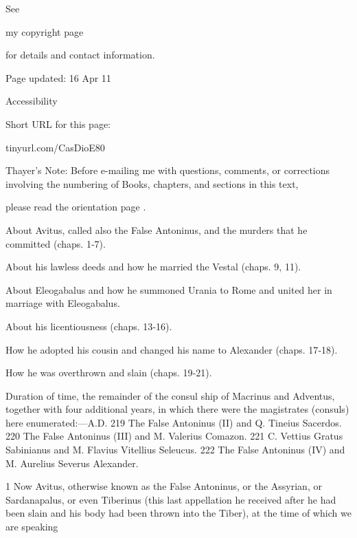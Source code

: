 See

my copyright page

for details and contact information.

Page updated:
16 Apr 11

Accessibility


Short URL for this page:

tinyurl.com/CasDioE80

Thayer's Note: Before e-mailing me with questions, comments, or corrections involving the numbering of Books, chapters, and sections in this text,

please read the orientation page .

About Avitus, called also the False Antoninus, and the murders that he committed (chaps. 1\texthebrew{‑}7).

About his lawless deeds and how he married the Vestal (chaps. 9, 11).

About Eleogabalus and how he summoned Urania to Rome and united her in marriage with Eleogabalus.

About his licentiousness (chaps. 13\texthebrew{‑}16).

How he adopted his cousin and changed his name to Alexander (chaps. 17\texthebrew{‑}18).

How he was overthrown and slain (chaps. 19\texthebrew{‑}21).

Duration of time, the remainder of the consul ­ship of Macrinus and Adventus, together with four additional years, in which there were the magistrates (consuls) here enumerated:\texthebrew{—}A.D.
219 The False Antoninus (II) and Q. Tineius Sacerdos.
220 The False Antoninus (III) and M. Valerius Comazon.
221 C. Vettius Gratus Sabinianus and M. Flavius Vitellius Seleucus.
222 The False Antoninus (IV) and M. Aurelius Severus Alexander.


1
Now Avitus, otherwise known as the False Antoninus, or the Assyrian, or Sardanapalus, or even Tiberinus (this last appellation he received after he had been slain and his body had been thrown into the Tiber), at the time of which we are speaking

